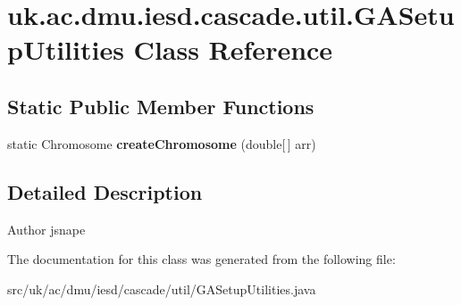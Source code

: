 \hypertarget{classuk_1_1ac_1_1dmu_1_1iesd_1_1cascade_1_1util_1_1_g_a_setup_utilities}{\section{uk.\-ac.\-dmu.\-iesd.\-cascade.\-util.\-G\-A\-Setup\-Utilities Class Reference}
\label{classuk_1_1ac_1_1dmu_1_1iesd_1_1cascade_1_1util_1_1_g_a_setup_utilities}
}
\subsection*{Static Public Member Functions}
\begin{DoxyCompactItemize}
\item 
\hypertarget{classuk_1_1ac_1_1dmu_1_1iesd_1_1cascade_1_1util_1_1_g_a_setup_utilities_a70565bd40d2ae9d3a09e00a197c21355}{static Chromosome {\bfseries create\-Chromosome} (double\mbox{[}$\,$\mbox{]} arr)}\label{classuk_1_1ac_1_1dmu_1_1iesd_1_1cascade_1_1util_1_1_g_a_setup_utilities_a70565bd40d2ae9d3a09e00a197c21355}

\end{DoxyCompactItemize}


\subsection{Detailed Description}
\begin{DoxyAuthor}{Author}
jsnape 
\end{DoxyAuthor}


The documentation for this class was generated from the following file\-:\begin{DoxyCompactItemize}
\item 
src/uk/ac/dmu/iesd/cascade/util/G\-A\-Setup\-Utilities.\-java\end{DoxyCompactItemize}
